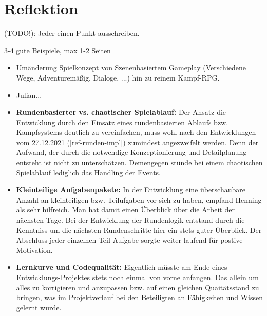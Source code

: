 
\section{Reflektion}
(TODO!): Jeder einen Punkt ausschreiben. 

3-4 gute Beispiele, max 1-2 Seiten

\begin{itemize}
    
    \item Umänderung Spielkonzept von Szenenbasiertem Gameplay (Verschiedene Wege, Adventuremäßig, Dialoge, ...) hin zu reinem Kampf-RPG.  
    
    \item Julian...

    \item \textbf{Rundenbasierter vs. chaotischer Spielablauf:} Der Ansatz die Entwicklung durch den Einsatz eines rundenbasierten Ablaufs bzw. Kampfsystems deutlich zu vereinfachen, muss wohl nach den Entwicklungen vom 27.12.2021 (\ref{ref-runden-impl}) zumindest angezweifelt werden. Denn der Aufwand, der durch die notwendige Konzeptionierung und Detailplanung entsteht ist nicht zu unterschätzen. Demengegen stünde bei einem chaotischen Spielablauf lediglich das Handling der Events. 

    \item \textbf{Kleinteilige Aufgabenpakete:} In der Entwicklung eine überschaubare Anzahl an kleinteiligen bzw. Teilufgaben vor sich zu haben, empfand Henning als sehr hilfreich. Man hat damit einen Überblick über die Arbeit der nächsten Tage. Bei der Entwicklung der Rundenlogik entstand durch die Kenntniss um die nächsten Rundenschritte hier ein stets guter Überblick. Der Abschluss jeder einzelnen Teil-Aufgabe sorgte weiter laufend für postive Motivation.

    \item \textbf{Lernkurve und Codequalität:} Eigentlich müsste am Ende eines Entwicklungs-Projektes stets noch einmal von vorne anfangen. Das allein um alles zu korrigieren und anzupassen bzw. auf einen gleichen Quaitätsstand zu bringen, was im Projektverlauf bei den Beteiligten an Fähigkeiten und Wissen gelernt wurde.
    

\end{itemize}

